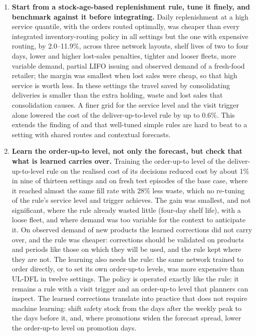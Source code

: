 \begin{enumerate}[leftmargin=*]
\item \textbf{Start from a stock-age-based replenishment rule, tune it finely, and benchmark against it before integrating.} Daily replenishment at a high service quantile, with the orders routed optimally, was cheaper than every integrated inventory-routing policy in all settings but the one with expensive routing, by 2.0--11.9\%, across three network layouts, shelf lives of two to four days, lower and higher lost-sales penalties, tighter and looser fleets, more variable demand, partial LIFO issuing and observed demand of a fresh-food retailer; the margin was smallest when lost sales were cheap, so that high service is worth less. In these settings the travel saved by consolidating deliveries is smaller than the extra holding, waste and lost sales that consolidation causes. A finer grid for the service level and the visit trigger alone lowered the cost of the deliver-up-to-level rule by up to 0.6\%. This extends the finding of \citet{haijema2019improved} and \citet{crama2018stochastic} that well-tuned simple rules are hard to beat to a setting with shared routes and contextual forecasts.
\item \textbf{Learn the order-up-to level, not only the forecast, but check that what is learned carries over.} Training the order-up-to level of the deliver-up-to-level rule on the realised cost of its decisions reduced cost by about 1\% in nine of thirteen settings and on fresh test episodes of the base case, where it reached almost the same fill rate with 28\% less waste, which no re-tuning of the rule's service level and trigger achieves. The gain was smallest, and not significant, where the rule already wasted little (four-day shelf life), with a loose fleet, and where demand was too variable for the context to anticipate it. On observed demand of new products the learned corrections did not carry over, and the rule was cheaper: corrections should be validated on products and periods like those on which they will be used, and the rule kept where they are not. The learning also needs the rule: the same network trained to order directly, or to set its own order-up-to levels, was more expensive than UL-DFL in twelve settings. The policy is operated exactly like the rule: it remains a rule with a visit trigger and an order-up-to level that planners can inspect. The learned corrections translate into practice that does not require machine learning: shift safety stock from the days after the weekly peak to the days before it, and, where promotions widen the forecast spread, lower the order-up-to level on promotion days.

\end{enumerate}
